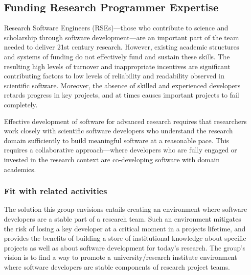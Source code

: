\subsection{Funding Research Programmer Expertise}
\label{RSE}



Research Software Engineers (RSEs)---those who contribute to science and
scholarship through software development---are an important part of the team
needed to deliver 21st century research. However, existing academic structures
and systems of funding do not effectively fund and sustain these skills. The
resulting high levels of turnover and inappropriate incentives are significant
contributing factors to low levels of reliability and readability observed in
scientific software. Moreover, the absence of skilled and experienced developers
retards progress in key projects, and at times causes important projects to fail
completely.

Effective development of software for advanced research requires that
researchers work closely with scientific software developers who understand the
research domain sufficiently to build meaningful software at a reasonable pace.
This requires a collaborative approach---where developers who are fully engaged
or invested in the research context are co-developing software with domain
academics.

\subsubsection{Fit with related activities}

The solution this group envisions entails creating an environment where software
developers are a stable part of a research team. Such an environment mitigates
the risk of losing a key developer at a critical moment in a projects lifetime,
and provides the benefits of building a store of institutional knowledge about
specific projects as well as about software development for today's research.
The group's vision is to find a way to promote a university/research institute
environment where software developers are stable components of research project
teams.

